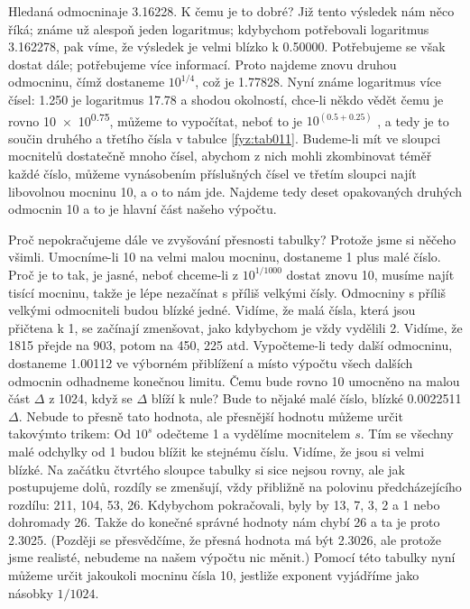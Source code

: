     Hledaná odmocninaje \num{3.16228}. K čemu je to dobré? Již tento výsledek nám něco říká; známe
    už alespoň jeden logaritmus; kdybychom potřebovali logaritmus \num{3.162278}, pak víme, že
    výsledek je velmi blízko k \num{0.500 00}. Potřebujeme se však dostat dále; potřebujeme více
    informací. Proto najdeme znovu druhou odmocninu, čímž dostaneme \(10^{1/4}\), což je
    \num{1.77828}. Nyní známe logaritmus více čísel: \num{1.250} je logaritmus \num{17.78} a shodou
    okolností, chce-li někdo vědět čemu je rovno \num{10e0.75}, můžeme to vypočítat, neboť to je
    \(10^{(0.5+0.25)}\) , a tedy je to součin druhého a třetího čísla v tabulce \ref{fyz:tab011}.
    Budeme-li mít ve sloupci mocnitelů dostatečně mnoho čísel, abychom z nich mohli zkombinovat
    téměř každé číslo, můžeme vynásobením příslušných čísel ve třetím sloupci najít libovolnou
    mocninu 10, a o to nám jde. Najdeme tedy deset opakovaných druhých odmocnin 10 a to je hlavní
    část našeho výpočtu.

    Proč nepokračujeme dále ve zvyšování přesnosti tabulky? Protože jsme si něčeho všimli.
    Umocníme-li \num{10} na velmi malou mocninu, dostaneme 1 plus malé číslo. Proč je to tak, je
    jasné, neboť chceme-li z \(10^{1/1000}\) dostat znovu \num{10}, musíme najít tisící mocninu,
    takže je lépe nezačínat s příliš velkými čísly. Odmocniny s příliš velkými odmocniteli budou
    blízké jedné. Vidíme, že malá čísla, která jsou přičtena k 1, se začínají zmenšovat, jako
    kdybychom je vždy vydělili 2. Vidíme, že \num{1815} přejde na \num{903}, potom na \num{450},
    \num{225} atd. Vypočteme-li tedy další odmocninu, dostaneme \num{1.00112} ve výborném přiblížení
    a místo výpočtu všech dalších odmocnin odhadneme konečnou limitu. Čemu bude rovno 10 umocněno na
    malou část \(\Delta\) z \num{1024}, když se \(\Delta\) blíží k nule? Bude to nějaké malé číslo,
    blízké \num{0.0022511} \(\Delta\). Nebude to přesně tato hodnota, ale přesnější hodnotu můžeme
    určit takovýmto trikem: Od \(10^s\) odečteme 1 a vydělíme mocnitelem \(s\). Tím se všechny malé
    odchylky od 1 budou blížit ke stejnému číslu. Vidíme, že jsou si velmi blízké. Na začátku
    čtvrtého sloupce tabulky si sice nejsou rovny, ale jak postupujeme dolů, rozdíly se zmenšují,
    vždy přibližně na polovinu předcházejícího rozdílu: \num{211}, \num{104}, \num{53}, \num{26}.
    Kdybychom pokračovali, byly by \num{13}, \num{7}, \num{3}, \num{2} a \num{1} nebo dohromady
    \num{26}. Takže do konečné správné hodnoty nám chybí \num{26} a ta je proto \num{2.3025}.
    (Později se přesvědčíme, že přesná hodnota má být \num{2.3026}, ale protože jsme realisté,
    nebudeme na našem výpočtu nic měnit.) Pomocí této tabulky nyní můžeme určit jakoukoli mocninu
    čísla 10, jestliže exponent vyjádříme jako násobky \(1/1024\).

